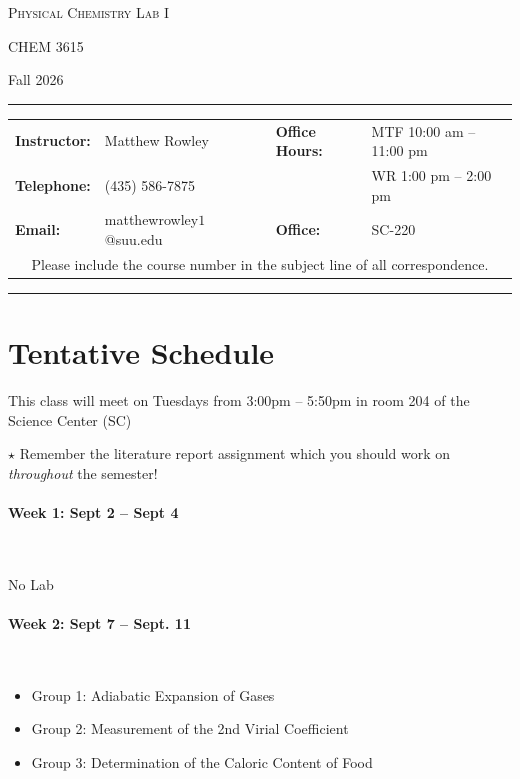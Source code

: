 \documentclass[12pt, letterpaper]{article}
\begin{document}
\begin{center}
	{\Large \textsc{Physical Chemistry Lab I}}

	CHEM 3615
\end{center}

\begin{center}
	{\large Fall 2026}
\end{center}
\begin{center}
	\rule{0.99\textwidth}{0.4pt}
	\begin{tabular}{llcll}
		\textbf{Instructor:} & Matthew Rowley           &  & \textbf{Office Hours:} & MTF 10:00 am -- 11:00 pm \\
		\textbf{Telephone:}  & (435) 586-7875           &  &                        & WR 1:00 pm -- 2:00 pm    \\
		\textbf{Email:}      & matthewrowley$1$@suu.edu &  & \textbf{Office:}       & SC-220                   \\
		\multicolumn{5}{c}{Please include the course number in the subject line of all correspondence.}
	\end{tabular}
	\rule{0.99\textwidth}{0.4pt}
\end{center}

\section*{Tentative Schedule}
This class will meet on Tuesdays from 3:00pm -- 5:50pm in room 204 of the Science Center (SC)

\noindent
$\star$ Remember the literature report assignment which you should work on \emph{throughout} the semester!

\paragraph{Week 1: Sept 2 -- Sept 4}~

No Lab

\paragraph{Week 2: Sept 7 -- Sept. 11}~

\begin{itemize}
	\item Group 1: Adiabatic Expansion of Gases
	\item Group 2: Measurement of the 2nd Virial Coefficient
	\item Group 3: Determination of the Caloric Content of Food
\end{itemize}
\end{document}
